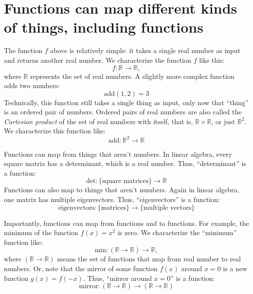 \section{Functions can map different kinds of things, including functions}

The function $f$ above is relatively simple: it takes a single real number as input
and returns another real number. We characterize the function $f$ like this:
\begin{equation*}
    f : \mathbb{R} \to \mathbb{R},
\end{equation*}
where $\mathbb{R}$ represents the set of real numbers. A slightly more complex function
adds two numbers:
\begin{equation*}
    \mathrm{add}(1, 2) = 3
\end{equation*}
Technically, this function still takes a single thing as input, only now that ``thing''
is an ordered pair of numbers. Ordered pairs of real numbers are also called the
\emph{Cartesian product} of the set of real numbers with itself, that is,
$\mathbb{R} \times \mathbb{R}$, or just $\mathbb{R}^2$. We characterize this function
like:
\begin{equation*}
    \mathrm{add} : \mathbb{R}^2 \to \mathbb{R}
\end{equation*}

Functions can map from things that aren't numbers. In linear algebra, every square matrix has a determinant, which is a real number. Thus, ``determinant'' is a function:
\begin{equation*}
    \mathrm{det} : \{\text{square matrices}\} \to \mathbb{R}
\end{equation*}
Functions can also map to things that aren't numbers. Again in linear algebra, one
matrix has multiple eigenvectors. Thus, ``eigenvectors'' is a function:
\begin{equation*}
    \mathrm{eigenvectors} : \{\text{matrices}\} \to \{\text{multiple vectors}\}
\end{equation*}

Importantly, functions can map from functions and to functions. For example,
the minimum of the function $f(x) = x^2$ is zero. We characterize the ``minimum''
function like:
\begin{equation*}
    \mathrm{min} : (\mathbb{R} \to \mathbb{R}) \to \mathbb{R},
\end{equation*}
where $(\mathbb{R} \to \mathbb{R})$ means the set of functions that map from real
number to real numbers. Or, note that the mirror of some function $f(x)$ around
$x=0$ is a new function $g(x) = f(-x)$. Thus, ``mirror around $x=0$'' is a function:
\begin{equation*}
    \mathrm{mirror} : (\mathbb{R} \to \mathbb{R}) \to (\mathbb{R} \to \mathbb{R})
\end{equation*}


